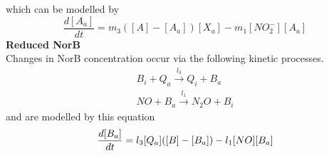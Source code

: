 which can be modelled by
\begin{equation}
\frac{d[A_a]}{dt} = m_3([A] - [A_a])[X_a]- m_{1}[NO_2^-][A_a]
\label{eq:active_ania}
\end{equation}
{\bf Reduced NorB}\\
Changes in NorB concentration occur via the following kinetic processes.
\begin{equation*}
\begin{gathered}
B_i + Q_a \xrightarrow{l_3} Q_i + B_a \\
NO + B_a \xrightarrow{l_1} N_{2}O + B_i
\end{gathered}
\end{equation*}
and are modelled by this equation
\begin{equation}
\frac{d[B_a]}{dt} = l_3[Q_a]([B] - [B_a]) - l_1[NO][B_a]\\
\label{eq:active_norb}
\end{equation}


